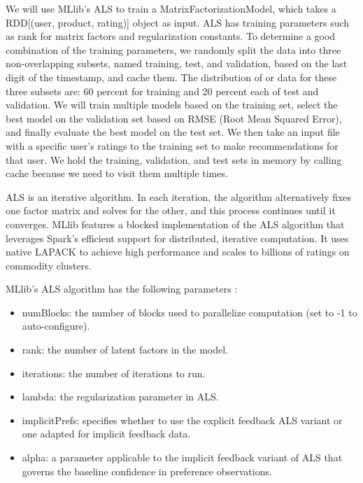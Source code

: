 \documentclass[conference]{IEEEtran}
\begin{document}
We will use MLlib’s ALS to train a MatrixFactorizationModel, which takes a RDD[(user, product, rating)] object as input. ALS has training parameters such as rank for matrix factors and regularization constants. To determine a good combination of the training parameters, we randomly split the data into three non-overlapping subsets, named training, test, and validation, based on the last digit of the timestamp, and cache them.  The distribution of or data for these three subsets are: 60 percent for training and 20 percent each of test and validation.  We will train multiple models based on the training set, select the best model on the validation set based on RMSE (Root Mean Squared Error), and finally evaluate the best model on the test set. We then take an input file with a specific user's ratings to the training set to make recommendations for that user. We hold the training, validation, and test sets in memory by calling cache because we need to visit them multiple times.

ALS is an iterative algorithm. In each iteration, the algorithm alternatively fixes one factor matrix and solves for the other, and this process continues until it converges. MLlib features a blocked implementation of the ALS algorithm that leverages Spark’s efficient support for distributed, iterative computation. It uses native LAPACK to achieve high performance and scales to billions of ratings on commodity clusters. 

MLlib's ALS algorithm has the following parameters \cite{ApacheSpark}:

\begin{itemize}
    \item numBlocks: the number of blocks used to parallelize computation (set to -1 to auto-configure).
    \item rank: the number of latent factors in the model.
    \item iterations: the number of iterations to run.
    \item lambda: the regularization parameter in ALS.
    \item implicitPrefs: specifies whether to use the explicit feedback ALS variant or one adapted for implicit feedback data.
    \item alpha: a parameter applicable to the implicit feedback variant of ALS that governs the baseline confidence in preference observations.
\end{itemize}
\end{document}
